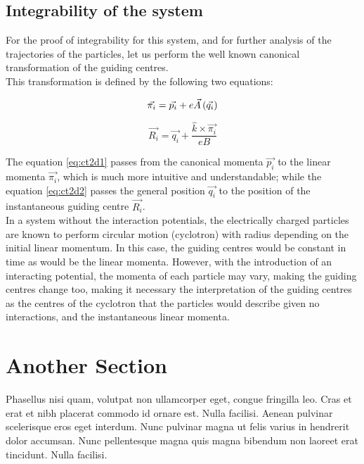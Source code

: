 \subsection{Integrability of the system}

For the proof of integrability for this system, and for further analysis of the trajectories of the particles, let us perform the well known canonical transformation of the guiding centres.\\

This transformation is defined by the following two equations:

\begin{equation}
\vec{\pi_i} = \vec{p_i} + e\vec{A}\left( \vec{q_i} \right)
\label{eq:ct2d1}
\end{equation}

\begin{equation}
\vec{R_i} = \vec{q_i} + \frac{\hat{k}\times\vec{\pi_i}}{eB}
\label{eq:ct2d2}
\end{equation}

The equation \ref{eq:ct2d1} passes from the canonical momenta $\vec{p_i}$ to the linear momenta $\vec{\pi_i}$, which is much more intuitive and understandable; while the equation \ref{eq:ct2d2} passes the general position  $\vec{q_i}$ to the position of the instantaneous guiding centre $\vec{R_i}$.\\

In a system without the interaction potentials, the electrically charged particles are known to perform circular motion (cyclotron) with radius depending on the initial linear momentum. In this case, the guiding centres would be constant in time as would be the linear momenta. However, with the introduction of an interacting potential, the momenta of each particle may vary, making the guiding centres change too, making it necessary the interpretation of the guiding centres as the centres of the cyclotron that the particles would describe given no interactions, and the instantaneous linear momenta.\\



\section{Another Section}

Phasellus nisi quam, volutpat non ullamcorper eget, congue fringilla leo. Cras et erat et nibh placerat commodo id ornare est. Nulla facilisi. Aenean pulvinar scelerisque eros eget interdum. Nunc pulvinar magna ut felis varius in hendrerit dolor accumsan. Nunc pellentesque magna quis magna bibendum non laoreet erat tincidunt. Nulla facilisi.

